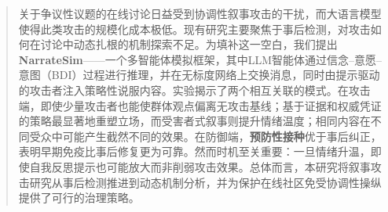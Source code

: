 \begin{abstract}
关于争议性议题的在线讨论日益受到协调性叙事攻击的干扰，而大语言模型使得此类攻击的规模化成本极低。现有研究主要聚焦于事后检测，对攻击如何在讨论中动态扎根的机制探索不足。为填补这一空白，我们提出\textbf{NarrateSim}——一个多智能体模拟框架，其中LLM智能体通过信念--意愿--意图（BDI）过程进行推理，并在无标度网络上交换消息，同时由提示驱动的攻击者注入策略性说服内容。实验揭示了两个相互关联的模式。在攻击端，即使少量攻击者也能使群体观点偏离无攻击基线；基于证据和权威凭证的策略最显著地重塑立场，而受害者式叙事则提升情绪温度；相同内容在不同受众中可能产生截然不同的效果。在防御端，\textbf{预防性接种}优于事后纠正，表明早期免疫比事后修复更为可靠。然而时机至关重要：一旦情绪升温，即使自我反思提示也可能放大而非削弱攻击效果。总体而言，本研究将叙事攻击研究从事后检测推进到动态机制分析，并为保护在线社区免受协调性操纵提供了可行的治理策略。
\end{abstract}
